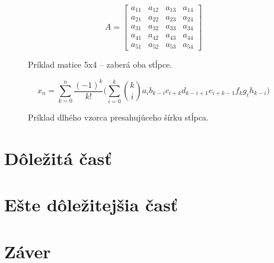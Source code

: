 \documentclass[10pt,twocolumn,twoside,slovak,a4paper]{article}
\begin{document}
\begin{figure}[t!]
\[
A = 
\begin{bmatrix}
a_{11} & a_{12} & a_{13} & a_{14} \\
a_{21} & a_{22} & a_{23} & a_{24} \\
a_{31} & a_{32} & a_{33} & a_{34} \\
a_{41} & a_{42} & a_{43} & a_{44} \\
a_{51} & a_{52} & a_{53} & a_{54}
\end{bmatrix}
\]
\caption{Príklad matice 5x4 – zaberá oba stĺpce.}
\label{fig:matrix}
\end{figure}

\begin{figure}[t!]
\[
x_n = \sum_{k=0}^{n} \frac{(-1)^k}{k!} \Bigg( \sum_{i=0}^{k} \binom{k}{i} a_i b_{k-i} c_{i+k} d_{k-i+1} e_{i+k-1} f_{k} g_{i} h_{k-i} \Bigg)
\]
\caption{Príklad dlhého vzorca presahujúceho šírku stĺpca.}
\label{fig:long-formula}
\end{figure}


\section{Dôležitá časť} \label{dolezita}




\section{Ešte dôležitejšia časť} \label{dolezitejsia}




\section{Záver} \label{zaver} %






\end{document}
